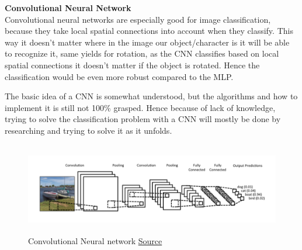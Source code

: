 \documentclass[11pt,a4paper,UKenglish]{article}
\begin{document}
\begin{flushleft}
  \textbf{Convolutional Neural Network} \\
  Convolutional neural networks are especially good for image
  classification, because they take local spatial connections into account when
  they classify. This way it doesn't matter where in the image our
  object/character is it will be able to recognize it, same yields for rotation,
  as the CNN classifies based on local spatial connections it doesn't matter if
  the object is rotated. Hence the classification would be even more robust
  compared to the MLP. \par
  The basic idea of a CNN is somewhat understood, but the algorithms and how to
  implement it is still not 100\% grasped. Hence because of lack of knowledge,
  trying to solve the classification problem with a CNN will mostly be done
  by researching and trying to solve it as it unfolds.
\end{flushleft}

\begin{figure}[H]
  \centering
  \includegraphics[height=4cm]{res/CNN_architecture.png}
  \caption{Convolutional Neural network \href{ http://www.wildml.com/2015/11/understanding-convolutional-neural-networks-for-nlp/}{Source}}
  \label{fig:CNN_architecture}
\end{figure}
\end{document}
